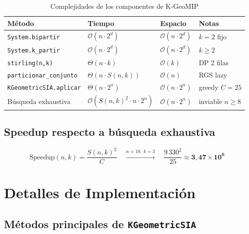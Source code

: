 \documentclass[12pt,letterpaper]{article}
\theoremstyle{definition}
\theoremstyle{remark}
\newcommand{\Stir}[2]{S(#1,#2)}
\newcommand{\BigO}[1]{\mathcal{O}(#1)}
\newcommand{\BigTheta}[1]{\Theta(#1)}
\begin{document}
\begin{table}[ht]
\centering
\caption{Complejidades de los componentes de K-GeoMIP}
\label{tab:complejidades}
\begin{tabular}{@{}l l l l@{}}
\toprule
\textbf{Método} & \textbf{Tiempo} & \textbf{Espacio} & \textbf{Notas} \\
\midrule
\texttt{System.bipartir}        & $\BigO{n \cdot 2^d}$ & $\BigO{n \cdot 2^d}$ & $k=2$ fijo \\
\texttt{System.k\_partir}       & $\BigO{n \cdot 2^d}$ & $\BigO{n \cdot 2^d}$ & $k \geq 2$ \\
\texttt{stirling(n,k)}          & $\BigTheta{n \cdot k}$ & $\BigO{k}$ & DP 2 filas \\
\texttt{particionar\_conjunto}  & $\BigTheta{n \cdot \Stir{n}{k}}$ & $\BigO{n}$ & RGS lazy \\
\texttt{KGeometricSIA.aplicar}  & $\BigTheta{n \cdot 2^n}$ & $\BigO{n \cdot 2^n}$ & greedy $C=25$ \\
Búsqueda exhaustiva             & $\BigO{\Stir{n}{k}^2 \cdot n \cdot 2^n}$ &
  $\BigO{n \cdot 2^n}$ & inviable $n \geq 8$ \\
\bottomrule
\end{tabular}
\end{table}

\subsection{Speedup respecto a búsqueda exhaustiva}

\begin{equation}
  \mathrm{Speedup}(n, k) = \frac{\Stir{n}{k}^2}{C}
  \quad \xrightarrow{n=10,\; k=3} \quad
  \frac{9\,330^2}{25} \approx \mathbf{3{,}47 \times 10^6}
  \label{eq:speedup}
\end{equation}

\section{Detalles de Implementación}
\label{sec:implementacion}

\subsection{Métodos principales de \texttt{KGeometricSIA}}
\end{document}
